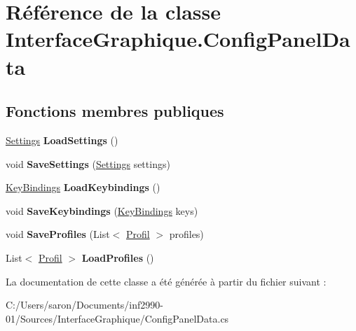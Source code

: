 \hypertarget{class_interface_graphique_1_1_config_panel_data}{\section{Référence de la classe Interface\-Graphique.\-Config\-Panel\-Data}
\label{class_interface_graphique_1_1_config_panel_data}
}
\subsection*{Fonctions membres publiques}
\begin{DoxyCompactItemize}
\item 
\hypertarget{class_interface_graphique_1_1_config_panel_data_abe79b5dc9ab2bf3acdc061442c002d27}{\hyperlink{class_interface_graphique_1_1_settings}{Settings} {\bfseries Load\-Settings} ()}\label{class_interface_graphique_1_1_config_panel_data_abe79b5dc9ab2bf3acdc061442c002d27}

\item 
\hypertarget{class_interface_graphique_1_1_config_panel_data_aea03392dee9190d4a1bade4fb7f2a909}{void {\bfseries Save\-Settings} (\hyperlink{class_interface_graphique_1_1_settings}{Settings} settings)}\label{class_interface_graphique_1_1_config_panel_data_aea03392dee9190d4a1bade4fb7f2a909}

\item 
\hypertarget{class_interface_graphique_1_1_config_panel_data_aac0027068cb2b782ccd0131adfee2dab}{\hyperlink{class_interface_graphique_1_1_key_bindings}{Key\-Bindings} {\bfseries Load\-Keybindings} ()}\label{class_interface_graphique_1_1_config_panel_data_aac0027068cb2b782ccd0131adfee2dab}

\item 
\hypertarget{class_interface_graphique_1_1_config_panel_data_a648cccdcb7afff19ce562792ed64976e}{void {\bfseries Save\-Keybindings} (\hyperlink{class_interface_graphique_1_1_key_bindings}{Key\-Bindings} keys)}\label{class_interface_graphique_1_1_config_panel_data_a648cccdcb7afff19ce562792ed64976e}

\item 
\hypertarget{class_interface_graphique_1_1_config_panel_data_af1303250bbfe56eda9c920ec42a590b8}{void {\bfseries Save\-Profiles} (List$<$ \hyperlink{class_interface_graphique_1_1_profil}{Profil} $>$ profiles)}\label{class_interface_graphique_1_1_config_panel_data_af1303250bbfe56eda9c920ec42a590b8}

\item 
\hypertarget{class_interface_graphique_1_1_config_panel_data_a04d1f1d54f539135c91891281411f4cf}{List$<$ \hyperlink{class_interface_graphique_1_1_profil}{Profil} $>$ {\bfseries Load\-Profiles} ()}\label{class_interface_graphique_1_1_config_panel_data_a04d1f1d54f539135c91891281411f4cf}

\end{DoxyCompactItemize}


La documentation de cette classe a été générée à partir du fichier suivant \-:\begin{DoxyCompactItemize}
\item 
C\-:/\-Users/saron/\-Documents/inf2990-\/01/\-Sources/\-Interface\-Graphique/Config\-Panel\-Data.\-cs\end{DoxyCompactItemize}
